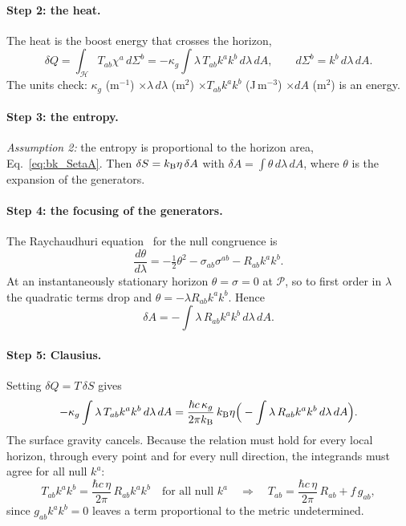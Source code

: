 \paragraph{Step 2: the heat.} The heat is the boost energy that crosses the horizon,
\begin{equation}
\delta Q=\int_{\mathcal H}T_{ab}\chi^a\,d\Sigma^b=-\kappa_g\int\lambda\,T_{ab}k^ak^b\,d\lambda\,dA ,\qquad d\Sigma^b=k^b\,d\lambda\,dA .
\end{equation}
The units check: $\kappa_g$ (m$^{-1}$) $\times\lambda\,d\lambda$ (m$^2$) $\times T_{ab}k^ak^b$ (J\,m$^{-3}$) $\times dA$ (m$^2$) is an energy. \derived{}

\paragraph{Step 3: the entropy.} \emph{Assumption 2:} the entropy is proportional to the horizon area, Eq.~\eqref{eq:bk_SetaA}. Then $\delta S=k_{\mathrm B}\eta\,\delta A$
with $\delta A=\int\theta\,d\lambda\,dA$, where $\theta$ is the expansion of the generators. \derived

\paragraph{Step 4: the focusing of the generators.} The Raychaudhuri equation~\cite{Raychaudhuri1955} for the null congruence is
\begin{equation}
\frac{d\theta}{d\lambda}=-\tfrac12\theta^2-\sigma_{ab}\sigma^{ab}-R_{ab}k^ak^b .
\end{equation}
At an instantaneously stationary horizon $\theta=\sigma=0$ at $\mathcal P$, so to first order in $\lambda$ the quadratic terms drop and
$\theta=-\lambda R_{ab}k^ak^b$. Hence
\begin{equation}
\delta A=-\int\lambda\,R_{ab}k^ak^b\,d\lambda\,dA .
\end{equation} \derived{}

\paragraph{Step 5: Clausius.} Setting $\delta Q=T\,\delta S$ gives
\begin{equation}
-\kappa_g\int\lambda\,T_{ab}k^ak^b\,d\lambda\,dA=\frac{\hbar c\,\kappa_g}{2\pi k_{\mathrm B}}\,k_{\mathrm B}\eta\Big(-\int\lambda\,R_{ab}k^ak^b\,d\lambda\,dA\Big).
\end{equation}
The surface gravity cancels. Because the relation must hold for every local horizon, through every point and for every null direction, the integrands
must agree for all null $k^a$:
\begin{equation}
T_{ab}k^ak^b=\frac{\hbar c\,\eta}{2\pi}\,R_{ab}k^ak^b\quad\text{for all null }k^a\quad\Longrightarrow\quad T_{ab}=\frac{\hbar c\,\eta}{2\pi}\,R_{ab}+f\,g_{ab},
\end{equation}
since $g_{ab}k^ak^b=0$ leaves a term proportional to the metric undetermined. \derived{}

